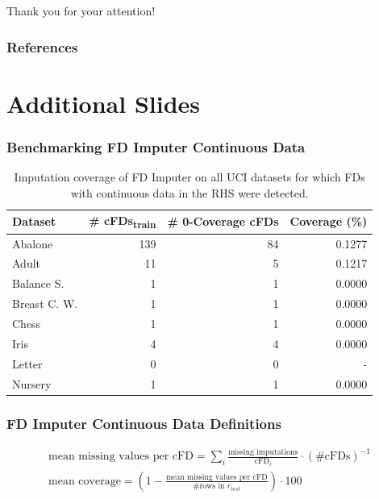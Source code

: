 \documentclass{beamer}
\begin{document}
\begin{frame}
    \begin{block}{}
        Thank you for your attention!
    \end{block}
\end{frame}
\begin{frame}[allowframebreaks]
\frametitle{References}
\printbibliography
\end{frame}

\section*{Additional Slides}
\begin{frame}
    \frametitle{Benchmarking FD Imputer Continuous Data}
    \begin{table}[ht]
        \centering
        \begin{tabular}{lrrr}
            \toprule
            \toprule
            Dataset & \# cFDs\textsubscript{train} & \# 0-Coverage cFDs  & Coverage (\%) \\
            \midrule
            Abalone & 139 & 84 & 0.1277 \\
            Adult & 11 & 5 & 0.1217 \\
            Balance S. & 1 & 1 & 0.0000 \\
            Breast C. W. & 1 & 1 & 0.0000 \\
            Chess & 1 & 1 & 0.0000 \\
            Iris & 4 & 4 & 0.0000 \\
            Letter & 0 & 0 & - \\
            Nursery & 1 & 1 & 0.0000 \\
            \bottomrule
            \bottomrule
        \end{tabular}
        \caption{Imputation coverage of FD Imputer on all UCI datasets for which FDs with continuous data in the RHS were detected.}\label{tab:fd-imputer-mse}
    \end{table}
\end{frame}

\begin{frame}
    \frametitle{FD Imputer Continuous Data Definitions}
    \begin{align*}
        \text{mean missing values per cFD} = \sum_{i} \frac{\text{missing imputations}}{\text{cFD}_i} \cdot \left(\text{\# cFDs}\right)^{-1} \\
        \text{mean coverage} = \left( 1 - \frac{\text{mean missing values per cFD}}{\text{\# rows in }r_{test}} \right) \cdot 100
    \end{align*}

\end{frame}
\end{document}
